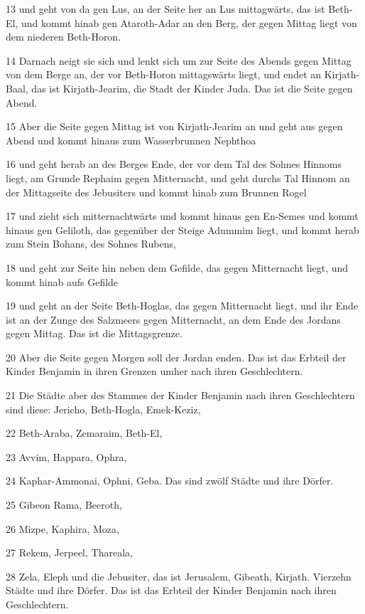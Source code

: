 \par 13 und geht von da gen Lus, an der Seite her an Lus mittagwärts, das ist Beth-El, und kommt hinab gen Ataroth-Adar an den Berg, der gegen Mittag liegt von dem niederen Beth-Horon.
\par 14 Darnach neigt sie sich und lenkt sich um zur Seite des Abends gegen Mittag von dem Berge an, der vor Beth-Horon mittagswärts liegt, und endet an Kirjath-Baal, das ist Kirjath-Jearim, die Stadt der Kinder Juda. Das ist die Seite gegen Abend.
\par 15 Aber die Seite gegen Mittag ist von Kirjath-Jearim an und geht aus gegen Abend und kommt hinaus zum Wasserbrunnen Nephthoa
\par 16 und geht herab an des Berges Ende, der vor dem Tal des Sohnes Hinnoms liegt, am Grunde Rephaim gegen Mitternacht, und geht durchs Tal Hinnom an der Mittagseite des Jebusiters und kommt hinab zum Brunnen Rogel
\par 17 und zieht sich mitternachtwärts und kommt hinaus gen En-Semes und kommt hinaus gen Geliloth, das gegenüber der Steige Adummim liegt, und kommt herab zum Stein Bohans, des Sohnes Rubens,
\par 18 und geht zur Seite hin neben dem Gefilde, das gegen Mitternacht liegt, und kommt hinab aufs Gefilde
\par 19 und geht an der Seite Beth-Hoglas, das gegen Mitternacht liegt, und ihr Ende ist an der Zunge des Salzmeers gegen Mitternacht, an dem Ende des Jordans gegen Mittag. Das ist die Mittagsgrenze.
\par 20 Aber die Seite gegen Morgen soll der Jordan enden. Das ist das Erbteil der Kinder Benjamin in ihren Grenzen umher nach ihren Geschlechtern.
\par 21 Die Städte aber des Stammes der Kinder Benjamin nach ihren Geschlechtern sind diese: Jericho, Beth-Hogla, Emek-Keziz,
\par 22 Beth-Araba, Zemaraim, Beth-El,
\par 23 Avvim, Happara, Ophra,
\par 24 Kaphar-Ammonai, Ophni, Geba. Das sind zwölf Städte und ihre Dörfer.
\par 25 Gibeon Rama, Beeroth,
\par 26 Mizpe, Kaphira, Moza,
\par 27 Rekem, Jerpeel, Thareala,
\par 28 Zela, Eleph und die Jebusiter, das ist Jerusalem, Gibeath, Kirjath. Vierzehn Städte und ihre Dörfer. Das ist das Erbteil der Kinder Benjamin nach ihren Geschlechtern.

